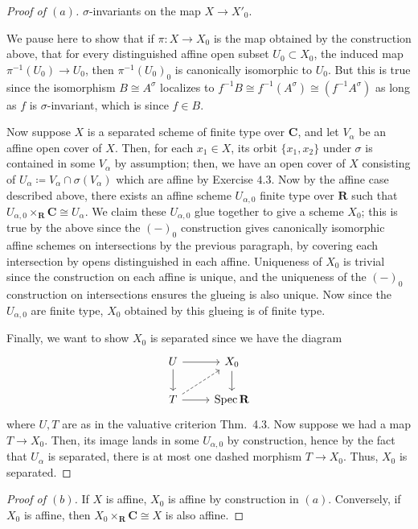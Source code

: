 \documentclass[10pt]{article}
\theoremstyle{definition}
\theoremstyle{remark}
\numberwithin{equation}{section}
\numberwithin{figure}{subsubsection}
\DeclareMathOperator{\Spec}{Spec}
\begin{document}
\begin{proof}[Proof of $(a)$]
  $\sigma$-invariants on the map $X \to X'_0$.
  \par We pause here to show that if $\pi\colon X \to X_0$ is the map obtained
  by the construction above, that for every distinguished affine open subset
  $U_0 \subset X_0$, the induced map $\pi^{-1}(U_0) \to U_0$, then $\pi^{-1}(U_0)_0$
  is canonically isomorphic to $U_0$. But this is true since the isomorphism $B
  \cong A^\sigma$ localizes to $f^{-1}B \cong f^{-1}(A^\sigma) \cong
  (f^{-1}A^\sigma)$ as long as $f$ is $\sigma$-invariant, which is since $f \in
  B$.
  \par Now suppose $X$ is a separated scheme of finite type over $\mathbf{C}$,
  and let $V_\alpha$ be an affine open cover of $X$. Then, for each
  $x_1 \in X$, its orbit $\{x_1,x_2\}$ under $\sigma$ is contained in some
  $V_\alpha$ by assumption; then, we have an open cover of $X$ consisting of
  $U_\alpha \coloneqq V_\alpha \cap \sigma(V_\alpha)$ which are affine by
  Exercise $4.3$. Now by the affine case
  described above, there exists an affine scheme $U_{\alpha,0}$ finite type over
  $\mathbf{R}$ such that $U_{\alpha,0} \times_\mathbf{R} \mathbf{C} \cong
  U_\alpha$. We claim these $U_{\alpha,0}$ glue together to give a scheme $X_0$;
  this is true by the above since the $(-)_{0}$ construction gives canonically
  isomorphic affine schemes on intersections by the previous paragraph, by
  covering each intersection by opens distinguished in each affine. Uniqueness
  of $X_0$ is trivial since the construction on each affine is unique, and the
  uniqueness of the $(-)_0$ construction on intersections ensures the glueing is
  also unique. Now since the $U_{\alpha,0}$ are finite type, $X_0$ obtained by this
  glueing is of finite type.
  \par Finally, we want to show $X_0$ is separated since we have the
  diagram
  \begin{equation*}
    \begin{tikzcd}
      U \rar\dar & X_0\dar\\
      T \rar\arrow[dashed]{ur} & \Spec \mathbf{R}
    \end{tikzcd}
  \end{equation*}
  where $U,T$ are as in the valuative criterion Thm.\ 4.3. Now suppose we had a
  map $T \to X_0$. Then, its image lands in some $U_{\alpha,0}$ by construction,
  hence by the fact that $U_\alpha$ is separated, there is at most one dashed
  morphism $T \to X_0$. Thus, $X_0$ is separated.
\end{proof}
\begin{proof}[Proof of $(b)$]
  If $X$ is affine, $X_0$ is affine by construction in $(a)$. Conversely, if
  $X_0$ is affine, then $X_0 \times_\mathbf{R} \mathbf{C} \cong X$ is also
  affine.
\end{proof}
\end{document}
